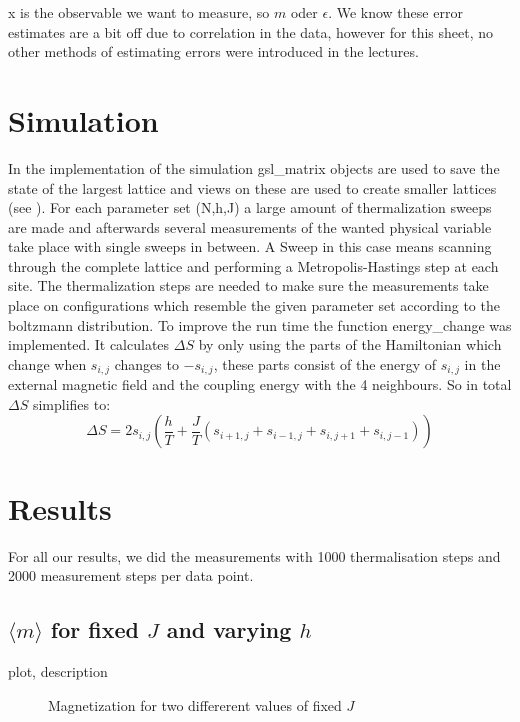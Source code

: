 \documentclass{scrartcl}
\begin{document}
x is the observable we want to measure, so $m$ oder $\epsilon$. We know these error estimates are a bit off due to correlation in the data, however for this sheet, no other methods of estimating errors were introduced in the lectures.

\section{Simulation}
In the implementation of the simulation gsl\_matrix objects are used to save the state of the largest lattice and views on these are used to create smaller lattices (see \cite{gsldoc_mat}). For each parameter set (N,h,J) a large amount of thermalization sweeps are made and afterwards several measurements of the wanted physical variable take place with single sweeps in between. A Sweep in this case means scanning through the complete lattice and performing a Metropolis-Hastings step at each site. The thermalization steps are needed to make sure the measurements take place on configurations which resemble the given parameter set according to the boltzmann distribution. To improve the run time the function energy\_change was implemented. It calculates $\Delta S$ by only using the parts of the Hamiltonian which change when $s_{i,j}$ changes to $-s_{i,j}$, these parts consist of the energy of $s_{i,j}$ in the external magnetic field and the coupling energy with the 4 neighbours.
So in total $\Delta S$ simplifies to:
\begin{equation}
	\Delta S=2 s_{i,j}\left(\dfrac{h}{T}+\dfrac{J}{T}(s_{i+1,j}+s_{i-1,j}+s_{i,j+1}+s_{i,j-1})\right)
\end{equation}


\section{Results}

For all our results, we did the measurements with 1000 thermalisation steps and 2000 measurement steps per data point.

\subsection{$\langle m\rangle$ for fixed $J$ and varying $h$}
plot, description

	\begin{figure}[htbp]
		
		\caption{Magnetization for two differerent values of fixed $J$}
		\label{fig:magfixJ}
	\end{figure}
\end{document}
